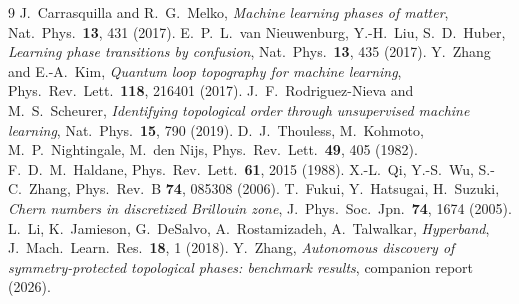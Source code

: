 \documentclass[11pt]{article}
\begin{document}
\begin{thebibliography}{9}\small
{} J.~Carrasquilla and R.~G.~Melko,
  \emph{Machine learning phases of matter}, Nat.\ Phys.\ \textbf{13}, 431 (2017).
 E.~P.~L.~van Nieuwenburg, Y.-H.~Liu, S.~D.~Huber,
  \emph{Learning phase transitions by confusion}, Nat.\ Phys.\ \textbf{13}, 435 (2017).
 Y.~Zhang and E.-A.~Kim,
  \emph{Quantum loop topography for machine learning}, Phys.\ Rev.\ Lett.\ \textbf{118}, 216401 (2017).
 J.~F.~Rodriguez-Nieva and M.~S.~Scheurer,
  \emph{Identifying topological order through unsupervised machine learning},
  Nat.\ Phys.\ \textbf{15}, 790 (2019).
 D.~J.~Thouless, M.~Kohmoto, M.~P.~Nightingale, M.~den Nijs,
  Phys.\ Rev.\ Lett.\ \textbf{49}, 405 (1982).
 F.~D.~M.~Haldane, Phys.\ Rev.\ Lett.\ \textbf{61}, 2015 (1988).
 X.-L.~Qi, Y.-S.~Wu, S.-C.~Zhang, Phys.\ Rev.\ B \textbf{74}, 085308 (2006).
 T.~Fukui, Y.~Hatsugai, H.~Suzuki,
  \emph{Chern numbers in discretized Brillouin zone}, J.\ Phys.\ Soc.\ Jpn.\ \textbf{74}, 1674 (2005).
 L.~Li, K.~Jamieson, G.~DeSalvo, A.~Rostamizadeh, A.~Talwalkar,
  \emph{Hyperband}, J.\ Mach.\ Learn.\ Res.\ \textbf{18}, 1 (2018).
 Y.~Zhang, \emph{Autonomous discovery of symmetry-protected
  topological phases: benchmark results}, companion report (2026).
\end{thebibliography}
\end{document}
